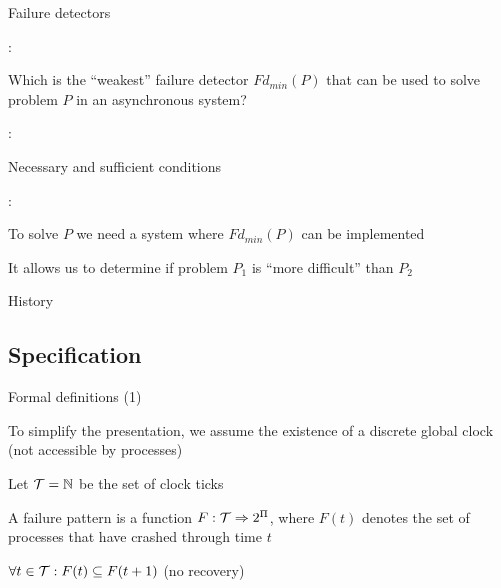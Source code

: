 \begin{frame}{Failure detectors}
	
:

Which is the “weakest” failure detector $\mathit{Fd}_{\mathit{min}}(P)$ that
can be used to solve problem $P$ in an asynchronous system?

\bigskip
{}:
\BI
\item Necessary and sufficient conditions
\EI

\bigskip
{}: 
\BI
\item To solve $P$ we need a system where $\mathit{Fd}_{\mathit{min}}(P)$ can be implemented
\item It allows us to determine if problem $P_1$ is “more difficult” than $P_2$
\EI

\end{frame}

\begin{frame}{History}
	
\begin{Bib}
\BIL
\item {} 
\item {}
\item {}
\EIL
\end{Bib}
\end{frame}


\subsection{Specification}

\begin{frame}{Formal definitions (1)}

\begin{definition}[Time]
\BI
\item To simplify the presentation, we assume the existence of a discrete
global clock (not accessible by processes)
\item Let ${\cal T} = \mathbb{N}$ be the \alert{set of clock ticks}
\EI
\end{definition}

\begin{definition}
A \alert{failure pattern} is a function $F: {\cal T} \Rightarrow 2^\Pi$,
where $F(t)$ denotes the set of processes that have crashed through time $t$
\BI
\item $\forall t \in {\cal T}: F(t) \subseteq F(t+1)$ (no recovery)
\EI
\end{definition}

\end{frame}

